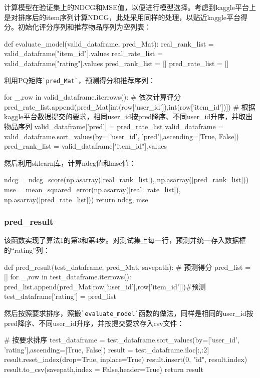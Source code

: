 \documentclass[12pt, a4paper]{ctexart}
\begin{document}
计算模型在验证集上的NDCG和MSE值，以便进行模型选择。考虑到kaggle平台上是对排序后的item序列计算NDCG，此处采用同样的处理，以贴近kaggle平台得分。初始化评分序列和推荐物品序列为空列表：

\begin{python}
def evaluate_model(valid_dataframe, pred_Mat):
    real_rank_list = valid_dataframe["item_id"].values
    real_rate_list = valid_dataframe["rating"].values
    pred_rank_list = []
    pred_rate_list = []
\end{python}

利用PQ矩阵\verb|`pred_Mat`|，预测得分和推荐序列：

\begin{python}
    for _,row in valid_dataframe.iterrows():
        # 依次计算评分
        pred_rate_list.append(pred_Mat[int(row['user_id']),int(row['item_id'])])
    # 根据kaggle平台数据提交的要求，相同user_id按pred降序、不同user_id升序，并取出物品序列
    valid_dataframe['pred'] = pred_rate_list
    valid_dataframe = valid_dataframe.sort_values(by=['user_id', 'pred'],ascending=[True, False])
    pred_rank_list = valid_dataframe["item_id"].values
\end{python}

然后利用sklearn库，计算ndcg值和mse值：

\begin{python}
    ndcg = ndcg_score(np.asarray([real_rank_list]), np.asarray([pred_rank_list]))
    mse = mean_squared_error(np.asarray([real_rate_list]), np.asarray([pred_rate_list]))
    return ndcg, mse
\end{python}


\subsubsection{pred\_result}

该函数实现了算法1的第3和第4步。对测试集上每一行，预测并统一存入数据框的“rating”列：

\begin{python}
def pred_result(test_dataframe, pred_Mat, savepath):
    # 预测得分
    pred_list = []
    for _,row in test_dataframe.iterrows():
        pred_list.append(pred_Mat[row['user_id'],row['item_id']])#预测
    test_dataframe['rating'] = pred_list
\end{python}

然后按照要求排序，照搬\verb|`evaluate_model`|函数的做法，同样是相同的user\_id按pred降序、不同user\_id升序，并按提交要求存入csv文件：

\begin{python}
    # 按要求排序
    test_dataframe = test_dataframe.sort_values(by=['user_id', 'rating'],ascending=[True, False])
    result = test_dataframe.iloc[:,:2]
    result.reset_index(drop=True, inplace=True)
    result.insert(0, "id", result.index)
    result.to_csv(savepath,index = False,header=True)
    return result
\end{python}
\end{document}
